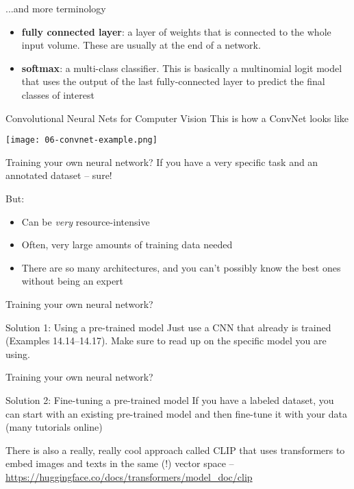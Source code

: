   \begin{frame}{...and more terminology}
    \begin{itemize}
      \item \textbf{fully connected layer}: a layer of weights that is connected to the whole input volume. These are usually at the end of a network.
      \item \textbf{softmax}: a multi-class classifier. This is basically a multinomial logit model that uses the output of the last fully-connected layer to predict the final classes of interest
      \end{itemize}
  \end{frame}

  \begin{frame}{Convolutional Neural Nets for Computer Vision}
    \large{This is how a ConvNet looks like} \vspace{0.1cm}
    \begin{center}
    \texttt{[image: 06-convnet-example.png]} 
    \end{center}
    \end{frame}

\begin{frame}{Training your own neural network?}
  If you have a very specific task and an annotated dataset -- sure!

  But:
  \begin{itemize}
  \item Can be \emph{very} resource-intensive
  \item Often, very large amounts of training data needed
  \item There are so many architectures, and you can't possibly know the best ones without being an expert
  \end{itemize}
\end{frame}

\begin{frame}{Training your own neural network?}
  \begin{block}{Solution 1: Using a pre-trained model}
Just use a CNN that already is trained (Examples 14.14--14.17). Make sure to read up on the specific model you are using.
  \end{block}
\end{frame}

\begin{frame}{Training your own neural network?}
  \begin{block}{Solution 2: Fine-tuning a pre-trained model}
If you have a labeled dataset, you can start with an existing pre-trained model and then fine-tune it with your data (many tutorials online)
  \end{block}

  There is also a really, really cool approach called CLIP that uses transformers to embed images and texts in the same  (!) vector space \parencite{radford2021clip} -- \tiny{\url{https://huggingface.co/docs/transformers/model_doc/clip}}

\end{frame}


